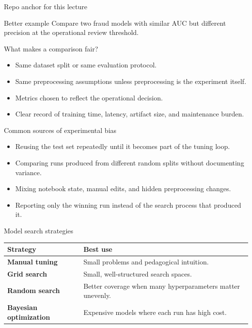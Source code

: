 \begin{frame}{Repo anchor for this lecture}
\begin{block}{Better example}
Compare two fraud models with similar AUC but different precision at the operational review threshold.
\end{block}
\coursefooter
\end{frame}

\begin{frame}{What makes a comparison fair?}
\begin{itemize}
\item Same dataset split or same evaluation protocol.
\item Same preprocessing assumptions unless preprocessing is the experiment itself.
\item Metrics chosen to reflect the operational decision.
\item Clear record of training time, latency, artifact size, and maintenance burden.
\end{itemize}
\coursefooter
\end{frame}

\begin{frame}{Common sources of experimental bias}
\begin{itemize}
\item Reusing the test set repeatedly until it becomes part of the tuning loop.
\item Comparing runs produced from different random splits without documenting variance.
\item Mixing notebook state, manual edits, and hidden preprocessing changes.
\item Reporting only the winning run instead of the search process that produced it.
\end{itemize}
\coursefooter
\end{frame}

\begin{frame}{Model search strategies}
\begin{tabularx}{\textwidth}{>{\bfseries}l X}
Strategy & Best use \\
\toprule
Manual tuning & Small problems and pedagogical intuition. \\
Grid search & Small, well-structured search spaces. \\
Random search & Better coverage when many hyperparameters matter unevenly. \\
Bayesian optimization & Expensive models where each run has high cost. \\
\bottomrule
\end{tabularx}
\coursefooter
\end{frame}

